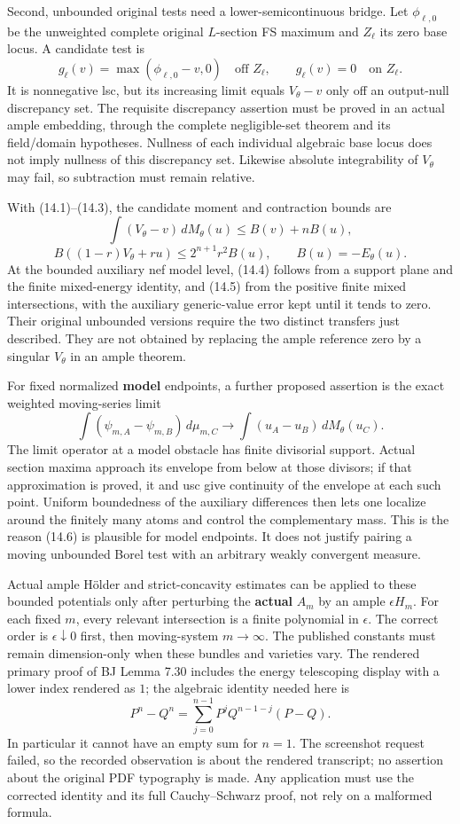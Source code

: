 \documentclass[
  10pt,
]{article}
\begin{document}
Second, unbounded original tests need a lower-semicontinuous bridge. Let
\(\phi_{\ell,0}\) be the unweighted complete original \(L\)-section FS
maximum and \(Z_\ell\) its zero base locus. A candidate test is
\[g_\ell(v)=\max(\phi_{\ell,0}-v,0)\quad\text{off }Z_\ell,
\qquad g_\ell(v)=0\quad\text{on }Z_\ell.\] It is nonnegative lsc, but
its increasing limit equals \(V_\theta-v\) only off an output-null
discrepancy set. The requisite discrepancy assertion must be proved in
an actual ample embedding, through the complete negligible-set theorem
and its field/domain hypotheses. Nullness of each individual algebraic
base locus does not imply nullness of this discrepancy set. Likewise
absolute integrability of \(V_\theta\) may fail, so subtraction must
remain relative.

With (14.1)--(14.3), the candidate moment and contraction bounds are
\[\int(V_\theta-v)\,dM_\theta(u)\leq B(v)+nB(u),\tag{14.4}\]
\[B((1-r)V_\theta+ru)\leq2^{n+1}r^2B(u),\qquad B(u)=-E_\theta(u).\tag{14.5}\]
At the bounded auxiliary nef model level, (14.4) follows from a support
plane and the finite mixed-energy identity, and (14.5) from the positive
finite mixed intersections, with the auxiliary generic-value error kept
until it tends to zero. Their original unbounded versions require the
two distinct transfers just described. They are not obtained by
replacing the ample reference zero by a singular \(V_\theta\) in an
ample theorem.

For fixed normalized \textbf{model} endpoints, a further proposed
assertion is the exact weighted moving-series limit
\[\int(\psi_{m,A}-\psi_{m,B})\,d\mu_{m,C}
\longrightarrow\int(u_A-u_B)\,dM_\theta(u_C).\tag{14.6}\] The limit
operator at a model obstacle has finite divisorial support. Actual
section maxima approach its envelope from below at those divisors; if
that approximation is proved, it and usc give continuity of the envelope
at each such point. Uniform boundedness of the auxiliary differences
then lets one localize around the finitely many atoms and control the
complementary mass. This is the reason (14.6) is plausible for model
endpoints. It does not justify pairing a moving unbounded Borel test
with an arbitrary weakly convergent measure.

Actual ample Hölder and strict-concavity estimates can be applied to
these bounded potentials only after perturbing the \textbf{actual}
\(A_m\) by an ample \(\epsilon H_m\). For each fixed \(m\), every
relevant intersection is a finite polynomial in \(\epsilon\). The
correct order is \(\epsilon\downarrow0\) first, then moving-system
\(m\to\infty\). The published constants must remain dimension-only when
these bundles and varieties vary. The rendered primary proof of BJ Lemma
7.30 includes the energy telescoping display with a lower index rendered
as \(1\); the algebraic identity needed here is
\[P^n-Q^n=\sum_{j=0}^{n-1}P^jQ^{n-1-j}(P-Q).\] In particular it cannot
have an empty sum for \(n=1\). The screenshot request failed, so the
recorded observation is about the rendered transcript; no assertion
about the original PDF typography is made. Any application must use the
corrected identity and its full Cauchy--Schwarz proof, not rely on a
malformed formula.
\end{document}
